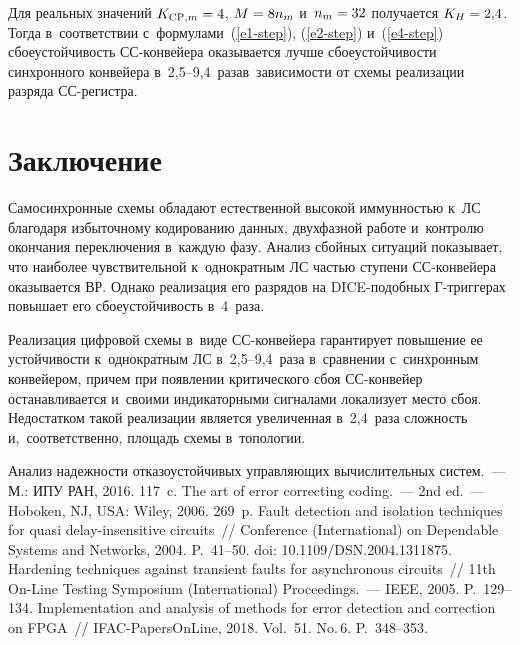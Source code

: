 \begin{multicols}{2}
Для реальных значений $K_{\mathrm{CP},m}\hm = 4$, $M\hm = 8n_m$ и~$n_m \hm= 32$ 
получается $K_H\hm = 2{,}4$. Тогда в~соответствии  
с~формулами~(\ref{e1-step}), (\ref{e2-step}) и~(\ref{e4-step}) сбоеустойчивость 
СС-кон\-вей\-ера оказывается лучше сбое\-устой\-чи\-вости синхронного 
конвейера в~2,5--9,4~раза\linebreak в~за\-ви\-си\-мости от схемы реализации разряда 
СС-ре\-гистра.

\section{Заключение}

  Самосинхронные схемы обладают естественной высокой иммунностью к~ЛС
   благодаря избыточному кодированию данных, двухфазной работе 
и~контролю окончания переключения в~каждую фазу. Анализ сбойных 
ситуаций показывает, что наиболее чувствительной к~однократным 
ЛС частью ступени СС-кон\-вей\-ера оказывается ВР. Однако реализация его разрядов на DICE-по\-доб\-ных  
Г-триг\-ге\-рах повышает его сбоеустойчивость в~4~раза.
  
  Реализация цифровой схемы в~виде СС-кон\-вей\-ера гарантирует 
повышение ее устойчивости к~однократным ЛС
в~2,5--9,4~раза в~сравнении с~синхронным конвейером, причем при 
появлении \mbox{критического} сбоя СС-кон\-вей\-ер останавливается и~своими 
индикаторными сигналами локализует место сбоя. Недостатком такой 
реализации является увеличенная в~2,4~раза сложность и,~соответственно, 
площадь схемы в~топологии.

\vspace*{-6pt}
  
{\small\frenchspacing
 {%
 \begin{thebibliography}{99}
  Анализ надежности 
отказоустойчивых управ\-ля\-ющих вы\-чис\-ли\-тель\-ных сис\-тем.~--- М.: ИПУ РАН, 2016. 117~c.
  The art of error correcting coding.~--- 2nd ed.~--- Hoboken, NJ, USA: Wiley, 
2006. 269~p.
  Fault detection and isolation techniques for quasi  
delay-insensitive circuits~// Conference (International) on Dependable Systems and Networks, 
2004. P.~41--50. doi: 10.1109/DSN.2004.1311875.
  Hardening techniques against transient faults for 
asynchronous circuits~// 11th On-Line Testing Symposium (International) Proceedings.~--- IEEE, 
2005. P.~129--134. 
  Implementation and analysis of methods for error detection 
and correction on FPGA~// IFAC-PapersOnLine, 2018. Vol.~51. No.\,6. P.~348--353.
 

\end{thebibliography}}}
\end{multicols}

